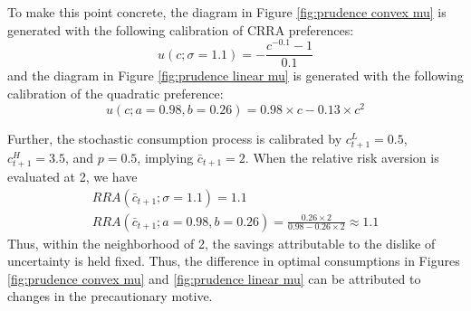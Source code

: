 \documentclass[11pt]{article}
\begin{document}
To make this point concrete, the diagram in Figure \ref{fig:prudence convex mu} is generated with the following calibration of CRRA preferences:
\[
u(c; \sigma = 1.1) = -\frac{c^{-0.1} - 1}{0.1}
\]
and the diagram in Figure \ref{fig:prudence linear mu} is generated with the following calibration of the quadratic preference:
\[
u(c; a = 0.98, b = 0.26) = 0.98 \times c - 0.13 \times c^2
\]

Further, the stochastic consumption process is calibrated by $c_{t+1}^L = 0.5$, $c_{t+1}^H = 3.5$, and $p = 0.5$, implying $\bar{c}_{t+1} = 2$. When the relative risk aversion is evaluated at 2, we have 
\begin{align*}
    RRA(\bar{c}_{t+1}; \sigma = 1.1) = 1.1 \\
    RRA(\bar{c}_{t+1}; a = 0.98, b = 0.26) = \frac{0.26 \times 2}{0.98 - 0.26 \times 2} \approx 1.1
\end{align*}
Thus, within the neighborhood of 2, the savings attributable to the dislike of uncertainty is held fixed. Thus, the difference in optimal consumptions in Figures \ref{fig:prudence convex mu} and \ref{fig:prudence linear mu} can be attributed to changes in the precautionary motive.
\end{document}

